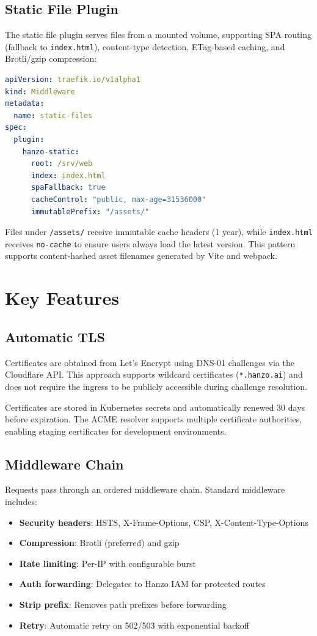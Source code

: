 \documentclass[11pt,twocolumn]{article}
\begin{document}
\subsection{Static File Plugin}

The static file plugin serves files from a mounted volume, supporting SPA routing (fallback to \texttt{index.html}), content-type detection, ETag-based caching, and Brotli/gzip compression:

\begin{lstlisting}[language=YAML]
apiVersion: traefik.io/v1alpha1
kind: Middleware
metadata:
  name: static-files
spec:
  plugin:
    hanzo-static:
      root: /srv/web
      index: index.html
      spaFallback: true
      cacheControl: "public, max-age=31536000"
      immutablePrefix: "/assets/"
\end{lstlisting}

Files under \texttt{/assets/} receive immutable cache headers (1 year), while \texttt{index.html} receives \texttt{no-cache} to ensure users always load the latest version. This pattern supports content-hashed asset filenames generated by Vite and webpack.

\section{Key Features}

\subsection{Automatic TLS}

Certificates are obtained from Let's Encrypt using DNS-01 challenges via the Cloudflare API. This approach supports wildcard certificates (\texttt{*.hanzo.ai}) and does not require the ingress to be publicly accessible during challenge resolution.

Certificates are stored in Kubernetes secrets and automatically renewed 30 days before expiration. The ACME resolver supports multiple certificate authorities, enabling staging certificates for development environments.

\subsection{Middleware Chain}

Requests pass through an ordered middleware chain. Standard middleware includes:

\begin{itemize}
    \item \textbf{Security headers}: HSTS, X-Frame-Options, CSP, X-Content-Type-Options
    \item \textbf{Compression}: Brotli (preferred) and gzip
    \item \textbf{Rate limiting}: Per-IP with configurable burst
    \item \textbf{Auth forwarding}: Delegates to Hanzo IAM for protected routes
    \item \textbf{Strip prefix}: Removes path prefixes before forwarding
    \item \textbf{Retry}: Automatic retry on 502/503 with exponential backoff
\end{itemize}
\end{document}
